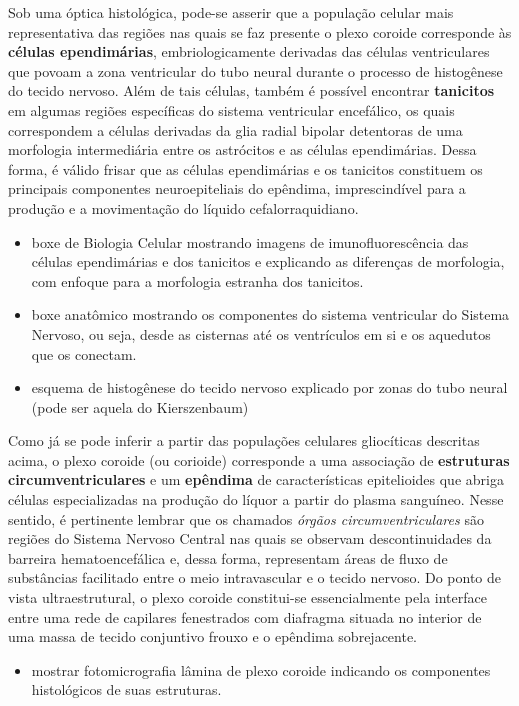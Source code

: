 \documentclass[
]{book}
\providecommand{\tightlist}{%
  \setlength{\itemsep}{0pt}\setlength{\parskip}{0pt}}
\theoremstyle{definition}
\theoremstyle{definition}
\theoremstyle{definition}
\theoremstyle{definition}
\theoremstyle{remark}
\begin{document}
Sob uma óptica histológica, pode-se asserir que a população celular mais representativa das regiões nas quais se faz presente o plexo coroide corresponde às \textbf{células ependimárias}, embriologicamente derivadas das células ventriculares que povoam a zona ventricular do tubo neural durante o processo de histogênese do tecido nervoso. Além de tais células, também é possível encontrar \textbf{tanicitos} em algumas regiões específicas do sistema ventricular encefálico, os quais correspondem a células derivadas da glia radial bipolar detentoras de uma morfologia intermediária entre os astrócitos e as células ependimárias. Dessa forma, é válido frisar que as células ependimárias e os tanicitos constituem os principais componentes neuroepiteliais do epêndima, imprescindível para a produção e a movimentação do líquido cefalorraquidiano.

\begin{itemize}
\item
  boxe de Biologia Celular mostrando imagens de imunofluorescência das células ependimárias e dos tanicitos e explicando as diferenças de morfologia, com enfoque para a morfologia estranha dos tanicitos.
\item
  boxe anatômico mostrando os componentes do sistema ventricular do Sistema Nervoso, ou seja, desde as cisternas até os ventrículos em si e os aquedutos que os conectam.
\item
  esquema de histogênese do tecido nervoso explicado por zonas do tubo neural (pode ser aquela do Kierszenbaum)
\end{itemize}

Como já se pode inferir a partir das populações celulares gliocíticas descritas acima, o plexo coroide (ou corioide) corresponde a uma associação de \textbf{estruturas circumventriculares} e um \textbf{epêndima} de características epitelioides que abriga células especializadas na produção do líquor a partir do plasma sanguíneo. Nesse sentido, é pertinente lembrar que os chamados \emph{órgãos circumventriculares} são regiões do Sistema Nervoso Central nas quais se observam descontinuidades da barreira hematoencefálica e, dessa forma, representam áreas de fluxo de substâncias facilitado entre o meio intravascular e o tecido nervoso. Do ponto de vista ultraestrutural, o plexo coroide constitui-se essencialmente pela interface entre uma rede de capilares fenestrados com diafragma situada no interior de uma massa de tecido conjuntivo frouxo e o epêndima sobrejacente.

\begin{itemize}
\tightlist
\item
  mostrar fotomicrografia lâmina de plexo coroide indicando os componentes histológicos de suas estruturas.
\end{itemize}
\end{document}
